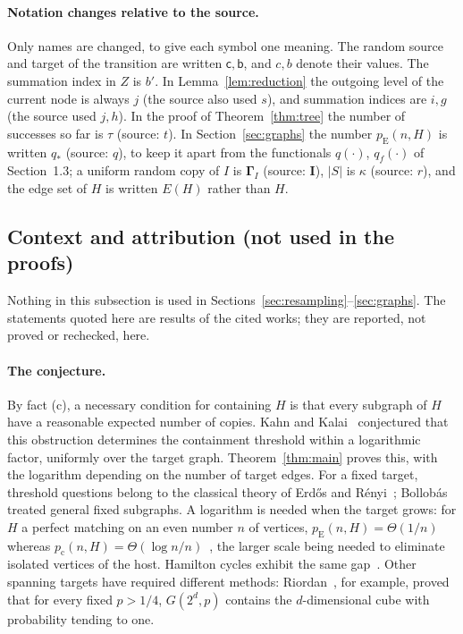 \documentclass[11pt]{article}
\numberwithin{equation}{section}
\newcommand{\pc}{p_{\mathrm c}}
\newcommand{\pE}{p_{\mathrm E}}
\newcommand{\src}{\mathsf c}
\newcommand{\tgt}{\mathsf b}
\newcommand{\GG}{\boldsymbol\Gamma}
\newcommand{\qs}{q_*}
\begin{document}
\paragraph{Notation changes relative to the source.}
Only names are changed, to give each symbol one meaning. The random
source and target of the transition are written $\src,\tgt$, and
$c,b$ denote their values. The summation index in $Z$ is $b'$. In
Lemma~\ref{lem:reduction} the outgoing level of the current node is
always $j$ (the source also used $s$), and summation indices are $i,g$
(the source used $j,h$). In the proof of Theorem~\ref{thm:tree} the
number of successes so far is $\tau$ (source: $t$). In
Section~\ref{sec:graphs} the number $\pE(n,H)$ is written $\qs$
(source: $q$), to keep it apart from the functionals $q(\cdot)$,
$q_f(\cdot)$ of Section~1.3; a uniform random copy of $I$ is $\GG_I$
(source: $\boldsymbol I$), $|S|$ is $\kappa$ (source: $r$), and the edge
set of $H$ is written $E(H)$ rather than $H$.

\subsection{Context and attribution (not used in the proofs)}

Nothing in this subsection is used in
Sections~\ref{sec:resampling}--\ref{sec:graphs}. The statements quoted
here are results of the cited works; they are reported, not proved or
rechecked, here.

\paragraph{The conjecture.}
By fact (c), a necessary condition for containing $H$ is that every
subgraph of $H$ have a reasonable expected number of copies. Kahn and
Kalai~\cite{KK07} conjectured that this obstruction determines the
containment threshold within a logarithmic factor, uniformly over the
target graph. Theorem~\ref{thm:main} proves this, with the logarithm
depending on the number of target edges. For a fixed target, threshold
questions belong to the classical theory of Erd\H{o}s and
R\'enyi~\cite{ER60}; Bollob\'as~\cite{Bollobas81} treated general fixed
subgraphs. A logarithm is needed when the target grows: for $H$ a
perfect matching on an even number $n$ of vertices,
$\pE(n,H)=\Theta(1/n)$ whereas
$\pc(n,H)=\Theta(\log n/n)$~\cite{ER66,KK07}, the larger scale being
needed to eliminate isolated vertices of the host. Hamilton cycles
exhibit the same gap~\cite{KK07}. Other spanning targets have required
different methods: Riordan~\cite{Riordan00}, for example, proved that
for every fixed $p>1/4$, $G(2^d,p)$ contains the $d$-dimensional cube
with probability tending to one.
\end{document}
